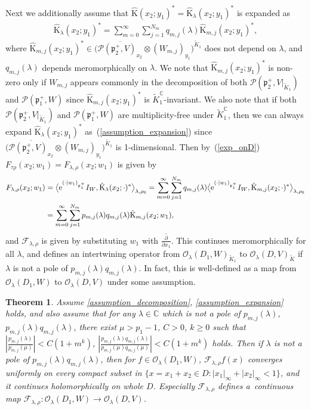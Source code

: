 \documentclass[pdftex]{sigma}
\numberwithin{equation}{section}
\newtheorem{Theorem}{Theorem}[section]
\newcommand{\BC}{\mathbb{C}}
\newcommand{\fp}{\mathfrak{p}}
\newcommand{\cF}{\mathcal{F}}
\newcommand{\cO}{\mathcal{O}}
\newcommand{\cP}{\mathcal{P}}
\newcommand{\rK}{\mathrm{K}}
\begin{document}
Next we additionally assume that $\hat{\rK}(x_2;y_1)^*=\hat{\rK}_\lambda(x_2;y_1)^*$ is expanded as
\begin{gather}\label{assumption_expansion}
\hat{\rK}_\lambda(x_2;y_1)^*=\sum_{m=0}^\infty \sum_{j=1}^{N_m}q_{m,j}(\lambda)\hat{\rK}_{m,j}(x_2;y_1)^*,
\end{gather}
where $\hat{\rK}_{m,j}(x_2;y_1)^*\in \big(\overline{\cP(\fp_2^+,V)_{x_2}}\otimes (W_{m,j})_{y_1}\big)^{\tilde{K}_1}$
does not depend on $\lambda$, and $q_{m,j}(\lambda)$ depends meromorphically on $\lambda$.
We note that $\hat{\rK}_{m,j}(x_2;y_1)^*$ is non-zero only if $W_{m,j}$ appears commonly in the decomposition of both
$\cP(\fp_2^+,V|_{\tilde{K}_1})$ and $\cP(\fp^+_1,W)$ since $\hat{\rK}_{m,j}(x_2;y_1)^*$ is $\tilde{K}_1^\BC$-invariant.
We also note that if both $\cP(\fp_2^+,V|_{\tilde{K}_1})$ and $\cP(\fp^+_1,W)$ are multiplicity-free under $\tilde{K}_1^\BC$,
then we can always expand $\hat{\rK}_\lambda(x_2;y_1)^*$ as~(\ref{assumption_expansion}) since
$\big(\overline{\cP(\fp_2^+,V)_{x_2}}\otimes (W_{m,j})_{y_1}\big)^{\tilde{K}_1}$ is 1-dimensional.
Then by~(\ref{exp_onD}) $F_{\tau\rho}(x_2;w_1)=F_{\lambda,\rho}(x_2;w_1)$ is given by
\begin{align}
F_{\lambda,\rho}(x_2;w_1)&=\big\langle {\rm e}^{(\cdot|w_1)_{\fp^+_1}}I_W,\hat{\rK}_\lambda(x_2;\cdot)^*\big\rangle_{\lambda,\rho_0}
=\sum_{m=0}^\infty \sum_{j=1}^{N_m}q_{m,j}(\lambda)\big\langle {\rm e}^{(\cdot|w_1)_{\fp^+_1}}I_W,\hat{\rK}_{m,j}(x_2;\cdot)^*\big\rangle_{\lambda,\rho_0} \notag \\
&=\sum_{m=0}^\infty \sum_{j=1}^{N_m}p_{m,j}(\lambda)q_{m,j}(\lambda)\hat{\rK}_{m,j}(x_2;w_1), \label{ext_of_FW}
\end{align}
and $\cF_{\lambda,\rho}$ is given by substituting $w_1$ with $\overline{\frac{\partial}{\partial x_1}}$.
This continues meromorphically for all $\lambda$, and defines an intertwining operator from $\cO_\lambda(D_1,W)_{\tilde{K}_1}$
to $\cO_\lambda(D,V)_{\tilde{K}}$ if $\lambda$ is not a pole of $p_{m,j}(\lambda)q_{m,j}(\lambda)$.
In fact, this is well-defined as a map from $\cO_\lambda(D_1,W)$ to $\cO_\lambda(D,V)$ under some assumption.
\begin{Theorem}\label{continuation}
Assume \eqref{assumption_decomposition}, \eqref{assumption_expansion} holds, and also assume that
for any $\lambda\in\BC$ which is not a pole of $p_{m,j}(\lambda)$, $p_{m,j}(\lambda)q_{m,j}(\lambda)$,
there exist $\mu>p_1-1$, $C>0$, $k\ge 0$ such that $\left|\frac{p_{m,j}(\lambda)}{p_{m,j}(\mu)}\right|<C(1+m^k)$,
$\left|\frac{p_{m,j}(\lambda)q_{m,j}(\lambda)}{p_{m,j}(\mu)q_{m,j}(\mu)}\right|<C(1+m^k)$ holds.
Then if $\lambda$ is not a pole of $p_{m,j}(\lambda)q_{m,j}(\lambda)$, then for $f\in\cO_\lambda(D_1,W)$,
$\cF_{\lambda,\rho}f(x)$ converges uniformly on every compact subset in $\{x=x_1+x_2\in D\colon |x_1|_\infty+|x_2|_\infty<1\}$,
and it continues holomorphically on whole $D$. Especially $\cF_{\lambda,\rho}$ defines a~continuous map
$\cF_{\lambda,\rho}\colon \cO_\lambda(D_1,W)\to \cO_\lambda(D,V)$.
\end{Theorem}
\end{document}
